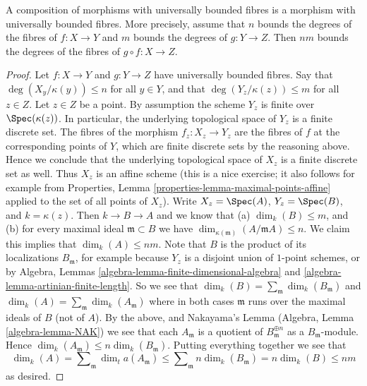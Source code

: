 \begin{lemma}
\label{lemma-composition-universally-bounded}
A composition of morphisms with universally bounded fibres
is a morphism with universally bounded fibres. More precisely,
assume that $n$ bounds the degrees of the fibres of $f : X \to Y$ and
$m$ bounds the degrees of $g : Y \to Z$.
Then $nm$ bounds the degrees of the fibres of $g \circ f : X \to Z$.
\end{lemma}

\begin{proof}
Let $f : X \to Y$ and $g : Y \to Z$ have universally bounded fibres.
Say that $\deg(X_y/\kappa(y)) \leq n$ for all $y \in Y$, and that
$\deg(Y_z/\kappa(z)) \leq m$ for all $z \in Z$.
Let $z \in Z$ be a point. By assumption the scheme
$Y_z$ is finite over $\Spec(\kappa(z))$.
In particular, the underlying topological space of $Y_z$
is a finite discrete set. The fibres of the morphism
$f_z : X_z \to Y_z$ are the fibres of $f$ at the corresponding
points of $Y$, which are finite discrete sets by the reasoning above.
Hence we conclude that the underlying topological space
of $X_z$ is a finite discrete set as well. Thus $X_z$ is an affine
scheme (this is a nice exercise; it also follows for example from
Properties, Lemma \ref{properties-lemma-maximal-points-affine}
applied to the set of all points of $X_z$). Write $X_z = \Spec(A)$,
$Y_z = \Spec(B)$, and $k = \kappa(z)$. Then $k \to B \to A$
and we know that (a) $\dim_k(B) \leq m$, and (b) for every maximal
ideal $\mathfrak m \subset B$ we have
$\dim_{\kappa(\mathfrak m)}(A/\mathfrak mA) \leq n$.
We claim this implies that $\dim_k(A) \leq nm$.
Note that $B$ is the product of its localizations $B_{\mathfrak m}$, for
example because $Y_z$ is a disjoint union of $1$-point schemes, or by
Algebra, Lemmas \ref{algebra-lemma-finite-dimensional-algebra} and
\ref{algebra-lemma-artinian-finite-length}.
So we see that
$\dim_k(B) = \sum_{\mathfrak m} \dim_k(B_{\mathfrak m})$ and
$\dim_k(A) = \sum_{\mathfrak m} \dim_k(A_{\mathfrak m})$ where
in both cases $\mathfrak m$ runs over the maximal ideals of
$B$ (not of $A$). By the above, and Nakayama's Lemma
(Algebra, Lemma \ref{algebra-lemma-NAK})
we see that each $A_{\mathfrak m}$ is a quotient of
$B_{\mathfrak m}^{\oplus n}$ as a $B_{\mathfrak m}$-module. Hence
$\dim_k(A_{\mathfrak m}) \leq n \dim_k(B_{\mathfrak m})$. Putting
everything together we see that
$$
\dim_k(A) = \sum\nolimits_{\mathfrak m} \dim_ta	(A_{\mathfrak m})
\leq \sum\nolimits_{\mathfrak m} n \dim_k(B_{\mathfrak m})
= n \dim_k(B) \leq nm
$$
as desired.
\end{proof}

